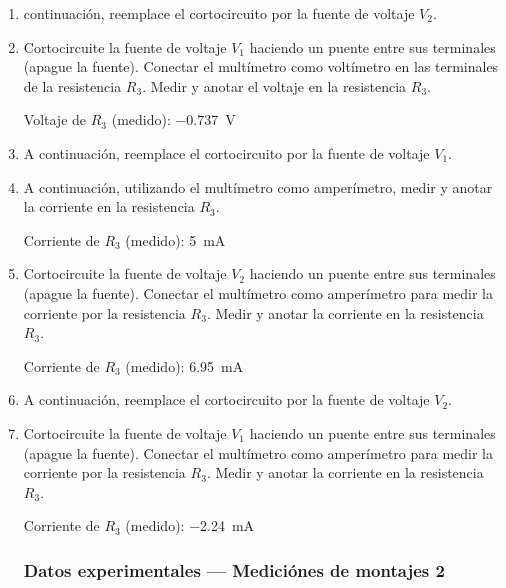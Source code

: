 \documentclass{article}
\begin{document}
\begin{enumerate}
        Voltaje de $R_3$ (medido): \SI{2.314}{\volt}

        \item  continuación, reemplace el cortocircuito por la fuente de voltaje $V_2$.

        \item Cortocircuite la fuente de voltaje $V_1$ haciendo un puente entre sus terminales (apague la fuente). Conectar el multímetro como voltímetro en las terminales de la resistencia $R_3$. Medir y anotar el voltaje en la resistencia $R_3$.
        
        Voltaje de $R_3$ (medido): \SI{-0.737}{\volt}

        \item A continuación, reemplace el cortocircuito por la fuente de voltaje $V_1$.
        
        \item A continuación, utilizando el multímetro como amperímetro, medir y anotar la corriente en la resistencia $R_3$.
        
        Corriente de $R_3$ (medido): \SI{5}{\milli\ampere}

        \item Cortocircuite la fuente de voltaje $V_2$ haciendo un puente entre sus terminales (apague la fuente). Conectar el multímetro como amperímetro para medir la corriente por la resistencia $R_3$. Medir y anotar la corriente en la resistencia $R_3$.
        
        Corriente de $R_3$ (medido): \SI{6.95}{\milli\ampere}

        \item A continuación, reemplace el cortocircuito por la fuente de voltaje $V_2$.
        
        \item Cortocircuite la fuente de voltaje $V_1$ haciendo un puente entre sus terminales (apague la fuente). Conectar el multímetro como amperímetro para medir la corriente por la resistencia $R_3$. Medir y anotar la corriente en la resistencia $R_3$.
        
        Corriente de $R_3$ (medido): \SI{-2.24}{\milli\ampere}

        \subsubsection*{Datos experimentales --- Mediciónes de montajes 2}


\end{enumerate}
\end{document}

